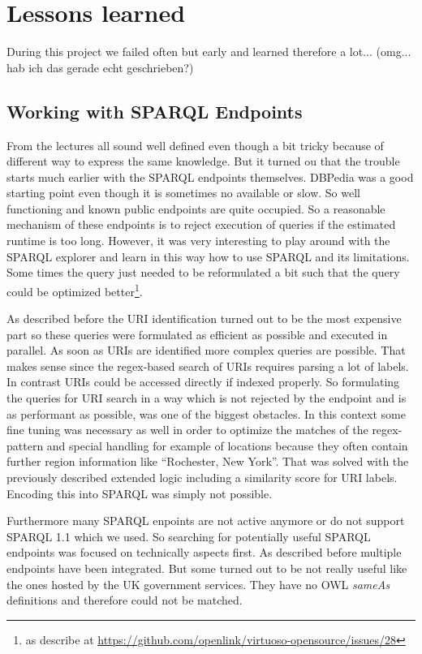 \section{Lessons learned}
During this project we failed often but early and learned therefore a lot... (omg... hab ich das gerade echt geschrieben?)

\subsection{Working with SPARQL Endpoints}
From the lectures all sound well defined even though a bit tricky because of different way to express the same knowledge. But it turned ou that the trouble starts much earlier with the SPARQL endpoints themselves.  DBPedia was a good starting point even though it is sometimes no available or slow. So well functioning and known public endpoints are quite occupied. So a reasonable mechanism of these endpoints is to reject execution of queries if the estimated runtime is too long. However, it was very interesting to play around with the SPARQL explorer and learn in this way how to use SPARQL and its limitations. Some times the query just needed to be reformulated a bit such that the query could be optimized better\footnote{as describe at \url{https://github.com/openlink/virtuoso-opensource/issues/28}}.

As described before the URI identification turned out to be the most expensive part so these queries were formulated as efficient as possible and executed in parallel. As soon as URIs are identified more complex queries are possible. That makes sense since the regex-based search of URIs requires parsing a lot of labels. In contrast URIs could be accessed directly if indexed properly. So formulating the queries for URI search in a way which is not rejected by the endpoint and is as performant as possible, was one of the biggest obstacles. In this context some fine tuning was necessary as well in order to optimize the matches of the regex-pattern and special handling  for example of locations because they often contain further region information like ``Rochester, New York''. That was solved with the previously described extended logic including a similarity score for URI labels. Encoding this into SPARQL was simply not possible.

Furthermore many SPARQL enpoints are not active anymore or do not support SPARQL 1.1 which we used. So searching for potentially useful SPARQL endpoints was focused on technically aspects first. As described before  multiple endpoints have been integrated. But some turned out to be not really useful like the ones hosted by the UK government services. They have no OWL \textit{sameAs} definitions and therefore could not be matched.

